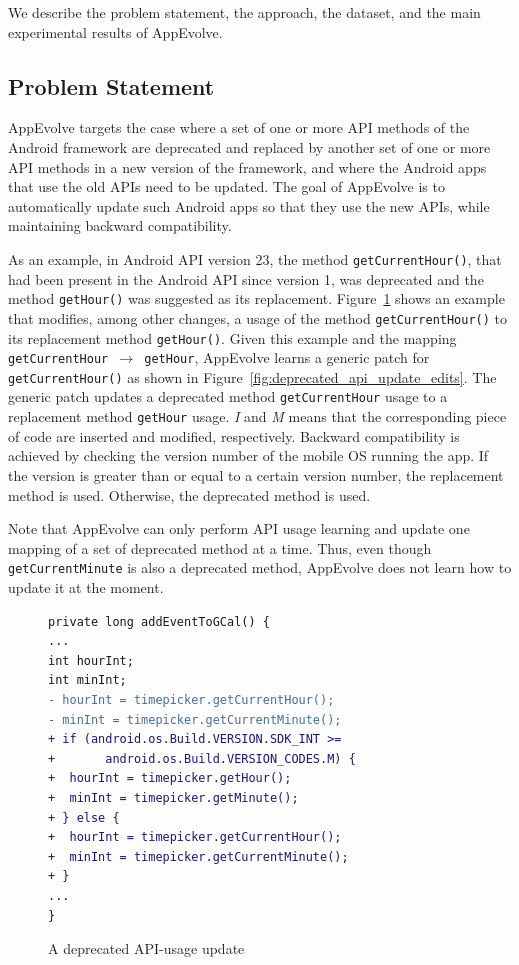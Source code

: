 We describe the problem statement, the approach, the dataset, and the main
experimental results of AppEvolve.

\subsection{Problem Statement}\label{sec:problem}

AppEvolve targets the case where a set of one or more API methods of the
Android framework are deprecated and replaced by another set of one or more
API methods in a new version of the framework, and where the Android apps
that use the old APIs need to be updated.  The goal of AppEvolve is to
automatically update such Android apps so that they use the new APIs, while
maintaining backward compatibility.


As an example, in Android API version 23, the method
{\tt get\-Current\-Hour()}, that had been present in the Android API since
version 1, was deprecated and the method \texttt{getHour()} was suggested
as its replacement.  Figure~\ref{fig:deprecated_api_update_example} shows
an example that modifies, among other changes, a usage of the method
\texttt{getCurrentHour()} to its replacement method \texttt{getHour()}.
Given this example and the mapping
\texttt{getCurrentHour $\rightarrow$ getHour}, AppEvolve learns a generic
patch for \texttt{getCurrentHour()} as shown in Figure~\ref{fig:deprecated_api_update_edits}.
The generic patch updates a
deprecated method \texttt{getCurrentHour} usage to a replacement method \texttt{getHour} usage.  {\em I} and {\em M} means that the corresponding piece of code are inserted and modified, respectively. Backward
compatibility is achieved by checking the version number of the mobile OS
running the app. If the version is greater than or equal to a certain
version number, the replacement method is used. Otherwise, the deprecated
method is used.

Note that AppEvolve can only perform API usage learning and update one mapping of a set of deprecated method at a time. Thus, even though {\tt getCurrentMinute} is also a deprecated method,  AppEvolve does not learn how to update it at the moment.

\begin{figure}[htb]
\begin{lstlisting}[language=diff,numbers=none]
private long addEventToGCal() {
...
int hourInt;
int minInt;
- hourInt = timepicker.getCurrentHour();
- minInt = timepicker.getCurrentMinute();
+ if (android.os.Build.VERSION.SDK_INT >=
+       android.os.Build.VERSION_CODES.M) {
+  hourInt = timepicker.getHour();
+  minInt = timepicker.getMinute();
+ } else {
+  hourInt = timepicker.getCurrentHour();
+  minInt = timepicker.getCurrentMinute();
+ }
...
}
\end{lstlisting}
\caption{A deprecated API-usage update}
\label{fig:deprecated_api_update_example}
\end{figure}

